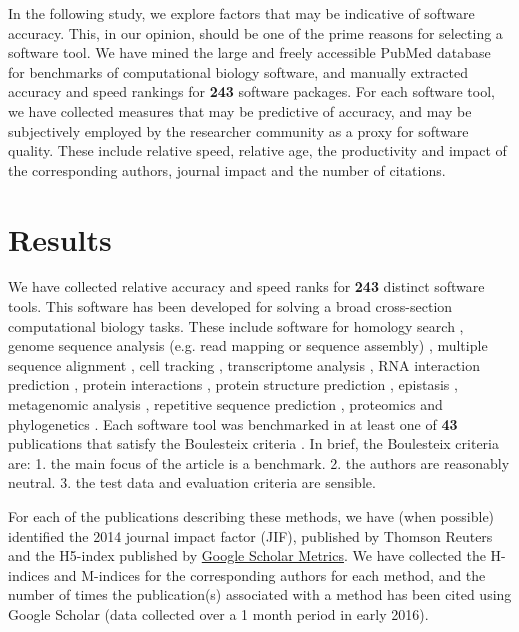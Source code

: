 \documentclass[fleqn,10pt]{SelfArx} %
\begin{document}
In the following study, we explore factors that may be indicative of software accuracy. This, in our opinion, should be one of the prime reasons for selecting a software tool. We have mined the large and freely accessible PubMed database \cite{Sayers2010-vm} for benchmarks of computational biology software, and manually extracted accuracy and speed rankings for \textbf{{\color{black}243}} software packages. For each software tool, we have collected measures that may be predictive of accuracy, and may be subjectively employed by the researcher community as a proxy for software quality. These include relative speed, relative age, the productivity and impact of the corresponding authors, journal impact and the number of citations. 

\section*{Results}
We have collected relative accuracy and speed ranks for \textbf{{\color{black}243}} distinct software tools. This software has been developed for solving a broad cross-section computational biology tasks. These include software for homology search \cite{Freyhult2007-et}, genome sequence analysis (e.g. read mapping or sequence assembly) \cite{Junemann2014-mb,Tran2014-pe,Zhang2011-nd,Abbas2014-gu,Bao2011-lv,Caboche2014-lj,Kleftogiannis2013-wi,Hatem2013-cs,Schbath2012-ob,Ruffalo2011-rl,Yang2013-aj,Holtgrewe2011-fd,Rackham2015-ag,Huang2015-wu}, multiple sequence alignment \cite{Thompson2011-rf,Nuin2006-nk,Pais2014-sr,Pervez2014-zp,Liu2010-rp}, cell tracking \cite{Maska2014-ak}, transcriptome analysis \cite{Li2012-wr,Lu2013-fs,Liu2014-kz,Kumar2016-xz}, RNA interaction prediction \cite{Pain2015-gr}, protein interactions \cite{Tikk2010-qd}, protein structure prediction \cite{Kolodny2005-ry,Wallner2005-qi}, epistasis \cite{Shang2011-vy},  metagenomic analysis \cite{Lindgreen2016-tt,Bazinet2012-wf}, repetitive sequence prediction \cite{Saha2008-kd}, proteomics \cite{Lange2008-pt,Yang2009-oc} and phylogenetics \cite{Liu2011-pz,Yang2011-dv,Oscamou2008-md,Bayzid2013-hc,Liu2009-lx}. Each software tool was benchmarked in at least one of \textbf{{\color{black}43}} publications that satisfy the Boulesteix criteria \cite{Boulesteix2013-vb}. In brief, the Boulesteix criteria are: 1. the main focus of the article is a benchmark. 2. the authors are reasonably neutral. 3. the test data and evaluation criteria are sensible.

For each of the publications describing these methods, we have (when possible) identified the 2014 journal impact factor (JIF), published by Thomson Reuters \cite{Garfield2006-lv} and the H5-index published by \href{https://scholar.google.co.nz/citations?view_op=top_venues&hl=en}{Google Scholar Metrics}. We have collected the H-indices and M-indices \cite{Hirsch2005-mt} for the corresponding authors for each method, and the number of times the publication(s) associated with a method has been cited using Google Scholar (data collected over a 1 month period in early 2016).
\end{document}
